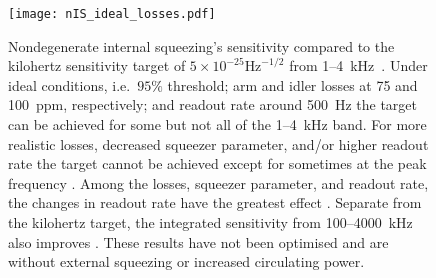 \begin{figure}
    \centering
    \texttt{[image: nIS\_ideal\_losses.pdf]}
    \caption{  Nondegenerate internal squeezing's sensitivity compared to the kilohertz sensitivity target of $5\times10^{-25}\text{Hz}^{-1/2}$ from 1--4~kHz~\cite{Miao2018}. Under ideal conditions, i.e.\ $95\%$ threshold; arm and idler losses at 75 and 100~ppm, respectively; and readout rate around 500~Hz the target can be achieved for some but not all of the 1--4~kHz band. For more realistic losses, decreased squeezer parameter, and/or higher readout rate the target cannot be achieved except for sometimes at the peak frequency . Among the losses, squeezer parameter, and readout rate, the changes in readout rate have the greatest effect . %
    Separate from the kilohertz target, the integrated sensitivity from 100--4000~kHz also improves . These results have not been optimised and are without external squeezing or increased circulating power.}
    \label{fig:nIS_sens_target}
\end{figure}


